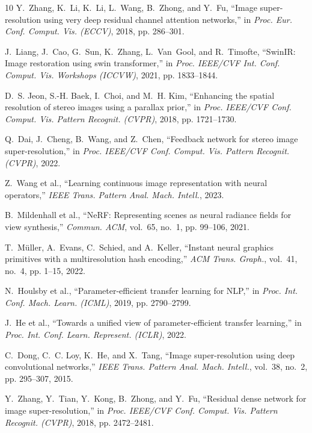\documentclass[10pt,journal,compsoc]{IEEEtran}
\begin{document}
\begin{thebibliography}{10}
Y.~Zhang, K.~Li, K.~Li, L.~Wang, B.~Zhong, and Y.~Fu, ``Image super-resolution using very deep residual channel attention networks,'' in \emph{Proc. Eur. Conf. Comput. Vis. (ECCV)}, 2018, pp. 286--301.

J.~Liang, J.~Cao, G.~Sun, K.~Zhang, L.~Van~Gool, and R.~Timofte, ``SwinIR: Image restoration using swin transformer,'' in \emph{Proc. IEEE/CVF Int. Conf. Comput. Vis. Workshops (ICCVW)}, 2021, pp. 1833--1844.

D.~S. Jeon, S.-H. Baek, I.~Choi, and M.~H. Kim, ``Enhancing the spatial resolution of stereo images using a parallax prior,'' in \emph{Proc. IEEE/CVF Conf. Comput. Vis. Pattern Recognit. (CVPR)}, 2018, pp. 1721--1730.

Q.~Dai, J.~Cheng, B.~Wang, and Z.~Chen, ``Feedback network for stereo image super-resolution,'' in \emph{Proc. IEEE/CVF Conf. Comput. Vis. Pattern Recognit. (CVPR)}, 2022.

Z.~Wang et al., ``Learning continuous image representation with neural operators,'' \emph{IEEE Trans. Pattern Anal. Mach. Intell.}, 2023.

B.~Mildenhall et al., ``NeRF: Representing scenes as neural radiance fields for view synthesis,'' \emph{Commun. ACM}, vol.~65, no.~1, pp. 99--106, 2021.

T.~M{\"u}ller, A.~Evans, C.~Schied, and A.~Keller, ``Instant neural graphics primitives with a multiresolution hash encoding,'' \emph{ACM Trans. Graph.}, vol.~41, no.~4, pp. 1--15, 2022.

N.~Houlsby et al., ``Parameter-efficient transfer learning for NLP,'' in \emph{Proc. Int. Conf. Mach. Learn. (ICML)}, 2019, pp. 2790--2799.

J.~He et al., ``Towards a unified view of parameter-efficient transfer learning,'' in \emph{Proc. Int. Conf. Learn. Represent. (ICLR)}, 2022.

C.~Dong, C.~C. Loy, K.~He, and X.~Tang, ``Image super-resolution using deep convolutional networks,'' \emph{IEEE Trans. Pattern Anal. Mach. Intell.}, vol.~38, no.~2, pp. 295--307, 2015.

Y.~Zhang, Y.~Tian, Y.~Kong, B.~Zhong, and Y.~Fu, ``Residual dense network for image super-resolution,'' in \emph{Proc. IEEE/CVF Conf. Comput. Vis. Pattern Recognit. (CVPR)}, 2018, pp. 2472--2481.

\end{thebibliography}
\end{document}
